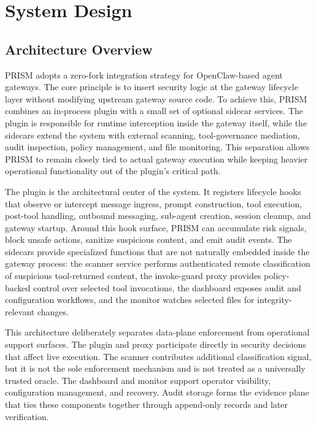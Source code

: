 \section{System Design}

\subsection{Architecture Overview}

PRISM adopts a zero-fork integration strategy for OpenClaw-based agent gateways. The core principle is to insert security logic at the gateway lifecycle layer without modifying upstream gateway source code. To achieve this, PRISM combines an in-process plugin with a small set of optional sidecar services. The plugin is responsible for runtime interception inside the gateway itself, while the sidecars extend the system with external scanning, tool-governance mediation, audit inspection, policy management, and file monitoring. This separation allows PRISM to remain closely tied to actual gateway execution while keeping heavier operational functionality out of the plugin's critical path.

The plugin is the architectural center of the system. It registers lifecycle hooks that observe or intercept message ingress, prompt construction, tool execution, post-tool handling, outbound messaging, sub-agent creation, session cleanup, and gateway startup. Around this hook surface, PRISM can accumulate risk signals, block unsafe actions, sanitize suspicious content, and emit audit events. The sidecars provide specialized functions that are not naturally embedded inside the gateway process: the scanner service performs authenticated remote classification of suspicious tool-returned content, the invoke-guard proxy provides policy-backed control over selected tool invocations, the dashboard exposes audit and configuration workflows, and the monitor watches selected files for integrity-relevant changes.

This architecture deliberately separates data-plane enforcement from operational support surfaces. The plugin and proxy participate directly in security decisions that affect live execution. The scanner contributes additional classification signal, but it is not the sole enforcement mechanism and is not treated as a universally trusted oracle. The dashboard and monitor support operator visibility, configuration management, and recovery. Audit storage forms the evidence plane that ties these components together through append-only records and later verification.

